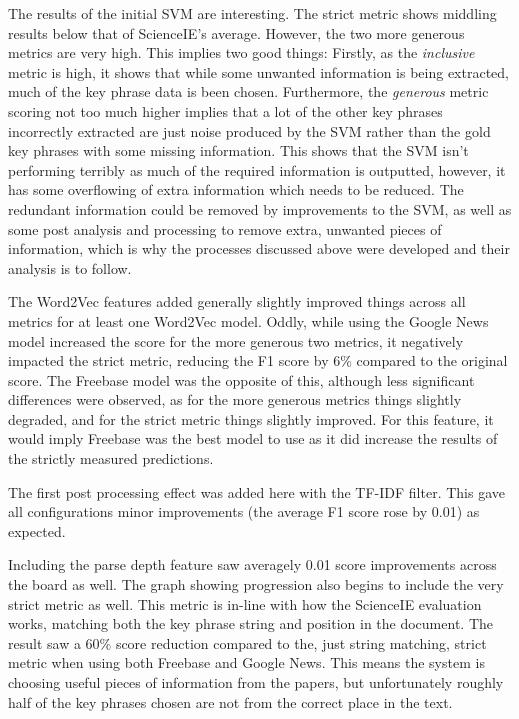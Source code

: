 The results of the initial SVM are interesting. The strict metric shows middling results below that of ScienceIE's average. However, the two more generous metrics are very high. This implies two good things: Firstly, as the \textit{inclusive} metric is high, it shows that while some unwanted information is being extracted, much of the key phrase data is been chosen. Furthermore, the \textit{generous} metric scoring not too much higher implies that a lot of the other key phrases incorrectly extracted are just noise produced by the SVM rather than the gold key phrases with some missing information. This shows that the SVM isn't performing terribly as much of the required information is outputted, however, it has some overflowing of extra information which needs to be reduced. The redundant information could be removed by improvements to the SVM, as well as some post analysis and processing to remove extra, unwanted pieces of information, which is why the processes discussed above were developed and their analysis is to follow.

The Word2Vec features added generally slightly improved things across all metrics for at least one Word2Vec model. Oddly, while using the Google News model increased the score for the more generous two metrics, it negatively impacted the strict metric, reducing the F1 score by 6\% compared to the original score. The Freebase model was the opposite of this, although less significant differences were observed, as for the more generous metrics things slightly degraded, and for the strict metric things slightly improved. For this feature, it would imply Freebase was the best model to use as it did increase the results of the strictly measured predictions. 

The first post processing effect was added here with the TF-IDF filter. This gave all configurations minor improvements (the average F1 score rose by 0.01) as expected. 

Including the parse depth feature saw averagely 0.01 score improvements across the board as well. The graph showing progression also begins to include the very strict metric as well. This metric is in-line with how the ScienceIE evaluation works, matching both the key phrase string and position in the document. The result saw a 60\% score reduction compared to the, just string matching, strict metric when using both Freebase and Google News. This means the system is choosing useful pieces of information from the papers, but unfortunately roughly half of the key phrases chosen are not from the correct place in the text. 

